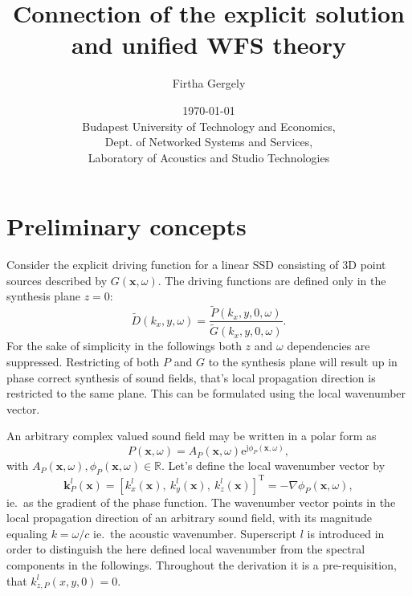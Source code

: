 \documentclass[12pt,a4paper]{article}
\title{Connection of the explicit solution and unified WFS theory}
\date{\today \\
Budapest University of Technology and Economics, \\ Dept. of Networked Systems and Services, \\ Laboratory of Acoustics and Studio Technologies}
\author{Firtha Gergely}
\newcommand{\te}{\mathrm{e}}
\newcommand{\ti}{\mathrm{j}}
\newcommand{\vx}{\mathbf{x}}
\newcommand{\vk}{\mathbf{k}}
\begin{document}
\maketitle

\section{Preliminary concepts}
Consider the explicit driving function for a linear SSD consisting of 3D point sources described by $G(\vx,\omega)$.
The driving functions are defined only in the synthesis plane $z=0$:
\begin{equation}
\tilde{D}(k_x,y,\omega) = \frac{\tilde{P}(k_x,y,0,\omega)}{\tilde{G}(k_x,y,0,\omega)}. 
\end{equation}
For the sake of simplicity in the followings both $z$ and $\omega$ dependencies are suppressed.
Restricting of both $P$ and $G$ to the synthesis plane will result up in phase correct synthesis of sound fields, that's local propagation direction is restricted to the same plane.
This can be formulated using the local wavenumber vector.

An arbitrary complex valued sound field may be written in a polar form as
\begin{equation}
P(\vx,\omega) = A_P(\vx,\omega) \te^{\ti \phi_P (\vx,\omega)},
\end{equation}
with $A_P(\vx,\omega), \phi_P(\vx,\omega) \in \mathbb{R} $.
Let's define the local wavenumber vector by
\begin{equation}
\vk^l_P(\vx) = [k_x^l(\vx),\ k_y^l(\vx),\ k_z^l(\vx)]^{\mathrm{T}} = -\nabla \phi_P(\vx,\omega),
\end{equation}
ie.\ as the gradient of the phase function.
The wavenumber vector points in the local propagation direction of an arbitrary sound field, with its magnitude equaling $k = \omega/c$ ie.\ the acoustic wavenumber.
Superscript $l$ is introduced in order to distinguish the here defined local wavenumber from the spectral components in the followings.
Throughout the derivation it is a pre-requisition, that $k_{z,P}^l(x,y,0) = 0$. 
\end{document}
